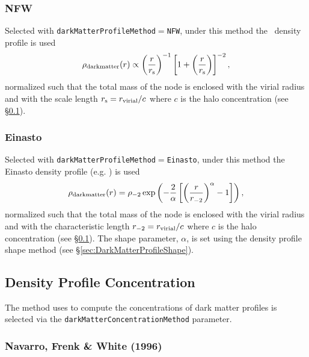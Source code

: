 \subsubsection{NFW}

Selected with {\tt darkMatterProfileMethod}$=${\tt NFW}, under this method the \NFW\ density profile \citep{navarro_universal_1997} is used
\begin{equation}
  \rho_{\rm dark matter}(r) \propto \left({r\over r_{\rm s}}\right)^{-1} \left[1 + \left({r\over r_{\rm s}}\right) \right]^{-2},
\end{equation}
normalized such that the total mass of the node is enclosed with the virial radius and with the scale length $r_{\rm s} = r_{\rm virial}/c$ where $c$ is the halo concentration (see \S\ref{sec:DarkMatterProfileConcentration}).

\subsubsection{Einasto}

Selected with {\tt darkMatterProfileMethod}$=${\tt Einasto}, under this method the Einasto density profile (e.g. \citealt{cardone_spherical_2005}) is used
\begin{equation}
  \rho_{\rm dark matter}(r) = \rho_{-2} \exp \left( - {2 \over \alpha} \left[ \left( {r \over r_{-2}} \right)^\alpha - 1 \right] \right),
\end{equation}
normalized such that the total mass of the node is enclosed with the virial radius and with the characteristic length $r_{-2} = r_{\rm virial}/c$ where $c$ is the halo concentration (see \S\ref{sec:DarkMatterProfileConcentration}). The shape parameter, $\alpha$, is set using the density profile shape method (see \S\ref{sec:DarkMatterProfileShape}).

\subsection{Density Profile Concentration}\label{sec:DarkMatterProfileConcentration}

The method uses to compute the concentrations of dark matter profiles is selected via the {\tt darkMatterConcentrationMethod} parameter.

\subsubsection{Navarro, Frenk \& White (1996)}


